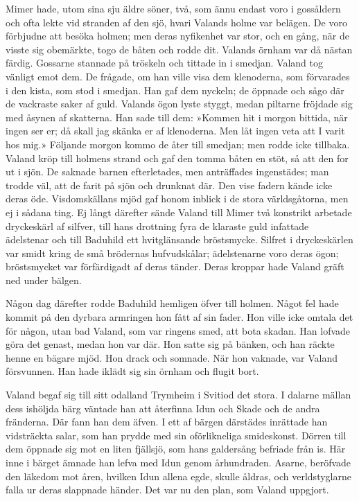 Mimer hade, utom sina sju äldre söner, två, som ännu endast voro i
gossåldern och ofta lekte vid stranden af den sjö, hvari Valands holme
var belägen. De voro förbjudne att besöka holmen; men deras nyfikenhet
var stor, och en gång, när de visste sig obemärkte, togo de båten och
rodde dit. Valands örnham var då nästan färdig. Gossarne stannade på
tröskeln och tittade in i smedjan. Valand tog vänligt emot dem. De
frågade, om han ville visa dem klenoderna, som förvarades i den kista,
som stod i smedjan. Han gaf dem nyckeln; de öppnade och sågo där de
vackraste saker af guld. Valands ögon lyste styggt, medan piltarne
fröjdade sig med åsynen af skatterna. Han sade till dem: »Kommen hit i
morgon bittida, när ingen ser er; då skall jag skänka er af klenoderna.
Men låt ingen veta att I varit hos mig.»
\protect\hypertarget{lb1625905.xhtmlux5cux23start102}{}{}\protect\hypertarget{lb1625905.xhtmlux5cux23start102-a}{}{}\protect\hypertarget{lb1625905.xhtmlux5cux23start102-b}{}{}\protect\hypertarget{lb1625905.xhtmlux5cux23start102-c}{}{}\protect\hypertarget{lb1625905.xhtmlux5cux23start102-d}{}{}
Följande morgon kommo de åter till smedjan; men rodde icke tillbaka.
Valand kröp till holmens strand och gaf den tomma båten en stöt, så att
den for ut i sjön. De saknade barnen efterletades, men anträffades
ingenstädes; man trodde väl, att de farit på sjön och drunknat där. Den
vise fadern kände icke deras öde. Visdomskällans mjöd gaf honom inblick
i de stora världsgåtorna, men ej i sådana ting. Ej långt därefter sände
Valand till Mimer två konstrikt arbetade dryckeskärl af silfver, till
hans drottning fyra de klaraste guld infattade ädelstenar och till
Baduhild ett hvitglänsande bröstsmycke. Silfret i dryckeskärlen var
smidt kring de små brödernas hufvudskålar; ädelstenarne voro deras ögon;
bröstsmycket var förfärdigadt af deras tänder. Deras kroppar hade Valand
gräft ned under bälgen.

Någon dag därefter rodde Baduhild hemligen öfver till holmen. Något fel
hade kommit på den dyrbara armringen hon fått af sin fader. Hon ville
icke omtala det för någon, utan bad Valand, som var ringens smed, att
bota skadan. Han lofvade göra det genast, medan hon var där. Hon satte
sig på bänken, och han räckte henne en bägare mjöd. Hon drack och
somnade. När hon vaknade, var Valand försvunnen. Han hade iklädt sig sin
örnham och flugit bort.

Valand begaf sig till sitt odalland Trymheim i Svitiod det stora. I
dalarne mällan dess ishöljda bärg väntade han att återfinna Idun och
Skade och de andra fränderna. Där fann han dem äfven. I ett af bärgen
därstädes inrättade han vidsträckta salar, som han prydde med sin
oförlikneliga smideskonst. Dörren till dem öppnade sig mot en liten
fjällsjö, som hans galdersång befriade från is. Här inne i bärget ämnade
han lefva med Idun genom århundraden. Asarne, beröfvade den läkedom mot
åren, hvilken Idun allena egde, skulle åldras, och verldstyglarne falla
ur deras slappnade händer. Det var nu den plan, som Valand uppgjort.

